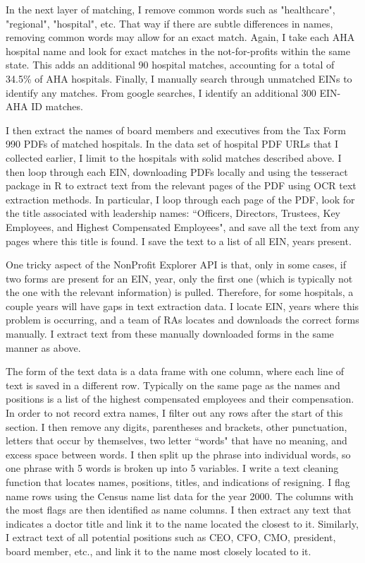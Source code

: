 \documentclass[12pt]{article}
\begin{document}
In the next layer of matching, I remove common words such as "healthcare", "regional", "hospital", etc. That way if there are subtle differences in names, removing common words may allow for an exact match. Again, I take each AHA hospital name and look for exact matches in the not-for-profits within the same state. This adds an additional 90 hospital matches, accounting for a total of 34.5\% of AHA hospitals. Finally, I manually search through unmatched EINs to identify any matches. From google searches, I identify an additional 300 EIN-AHA ID matches.

I then extract the names of board members and executives from the Tax Form 990 PDFs of matched hospitals. In the data set of hospital PDF URLs that I collected earlier, I limit to the hospitals with solid matches described above. I then loop through each EIN, downloading PDFs locally and using the tesseract package in R to extract text from the relevant pages of the PDF using OCR text extraction methods. In particular, I loop through each page of the PDF, look for the title associated with leadership names: ``Officers, Directors, Trustees, Key Employees, and Highest Compensated Employees", and save all the text from any pages where this title is found. I save the text to a list of all EIN, years present. 

One tricky aspect of the NonProfit Explorer API is that, only in some cases, if two forms are present for an EIN, year, only the first one (which is typically not the one with the relevant information) is pulled. Therefore, for some hospitals, a couple years will have gaps in text extraction data. I locate EIN, years where this problem is occurring, and a team of RAs locates and downloads the correct forms manually. I extract text from these manually downloaded forms in the same manner as above. 

The form of the text data is a data frame with one column, where each line of text is saved in a different row. Typically on the same page as the names and positions is a list of the highest compensated employees and their compensation. In order to not record extra names, I filter out any rows after the start of this section. I then remove any digits, parentheses and brackets, other punctuation, letters that occur by themselves, two letter ``words" that have no meaning, and excess space between words. I then split up the phrase into individual words, so one phrase with 5 words is broken up into 5 variables. I write a text cleaning function that locates names, positions, titles, and indications of resigning. I flag name rows using the Census name list data for the year 2000. The columns with the most flags are then identified as name columns. I then extract any text that indicates a doctor title and link it to the name located the closest to it. Similarly, I extract text of all potential positions such as CEO, CFO, CMO, president, board member, etc., and link it to the name most closely located to it. 
\end{document}
